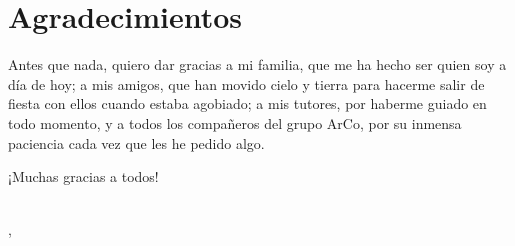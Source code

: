 \ifspanish
\else
\fi


%
%
\chapter*{Agradecimientos} %

Antes que nada, quiero dar gracias a mi familia, que me ha hecho ser quien soy a día de hoy; a mis amigos, que han movido cielo y tierra para hacerme salir de fiesta con ellos cuando estaba agobiado; a mis tutores, por haberme guiado en todo momento, y a todos los compañeros del grupo \ac{ArCo}, por su inmensa paciencia cada vez que les he pedido algo.

¡Muchas gracias a todos!


\makeatletter		
\begin{flushright}
	\vspace{1,5cm}
	\textit{\@autor}\\
	\@cityTF, \@yearTF
\end{flushright}
\makeatother
